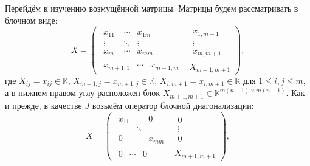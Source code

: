 Перейдём к изучению возмущённой матрицы.
Матрицы будем рассматривать в блочном виде:
\[
    X =
        \left(\begin{array}{c|c}
            \begin{matrix}
                x_{11} & \cdots & x_{1m} \\
                \vdots & \ddots & \vdots \\
                x_{m1} & \cdots & x_{mm}
            \end{matrix} &
            \begin{matrix}
                x_{1,m+1} \\
                \vdots \\
                x_{m,m+1}
            \end{matrix} \\ \hline
            \begin{matrix}
                x_{m+1,1} &
                \cdots &
                x_{m+1,m}
            \end{matrix} &
            X_{m+1,m+1}
        \end{array}\right),
    \]
где
\( X_{ij}      {=} x_{ij}      {\in} \mathbb{K} \),
\( X_{m{+}1,j} {=} x_{m{+}1,j} {\in} \mathbb{K} \),
\( X_{i,m{+}1} {=} x_{i,m{+}1} {\in} \mathbb{K} \)
для \( 1\leq i,j \leq m \),
а в нижнем правом углу расположен блок
\( X_{m{+}1,m{+}1} {\in} \mathbb{K}^{m(n{-}1){\times}m(n-1)} \).
Как и прежде, в качестве \( J \)
возьмём оператор блочной диагонализации:
\[
    X =
        \left(\begin{array}{c|c}
            \begin{matrix}
                x_{11} &  & 0 \\
                 & \ddots &  \\
                0 &  & x_{mm}
            \end{matrix} &
            \begin{matrix}
                0 \\
                \vdots \\
                0
            \end{matrix} \\ \hline
            \begin{matrix}
                0 & \cdots & 0
            \end{matrix} &
            X_{m+1,m+1}
        \end{array}\right),
    \]

